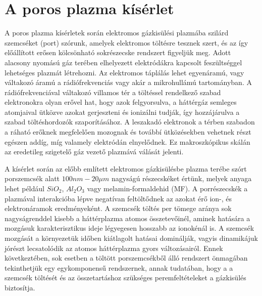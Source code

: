 \chapter{A poros plazma kísérlet}


{\color{red}
	A poros plazma kísérletek során elektromos gázkisülési
        plazmába szilárd szemcséket (port) szórunk, amelyek
        elektromos töltésre tesznek szert, és az így
        előállított erősen kölcsönható sokrészecske rendszert
        figyeljük meg. Adott alacsony nyomású gáz terében elhelyezett
        elektródákra kapcsolt feszültséggel  
	lehetséges plazmát létrehozni. Az elektromos táplálás lehet
        egyenáramú, vagy váltakozó áramú a rádiófrekvenciás vagy akár
        a mikrohullámú tartományban. A rádiófrekvenciával váltakozó
        villamos tér a töltéssel rendelkező szabad elektronokra 
	olyan erővel hat, hogy azok felgyorsulva, a háttérgáz semleges
        atomjaival ütközve azokat gerjeszteni és ionizálni tudják, így
        hozzájárulva a szabad töltéshordozók szaporításához.
	A leszakadó elektronok a térben szabadon a ráható erőknek
        megfelelően mozognak és továbbí ütközésekben vehetnek részt
        egészen addíg, míg valamely elektródán elnyelődnek.
	Ez makroszkópikus skálán az eredetileg szigetelő gáz vezető
        plazmává válását jelenti.  

A kísérlet során az előbb említett elektromos gázkisülésbe plazma terébe szórt porszemcsék alatt
	$100nm - 20\mu m$ nagyságú részecskéket értünk, melyek anyaga
        lehet például $SiO_2$, $Al_2O_3$ vagy 
	melamin-formaldehid (MF). A porrészecskék a plazmával
        interakcióba lépve negatívan feltöltődnek az azokat érő ion-,
        és elektronáramok eredményeként. A szemcsék töltés per tömege
        aránya sok nagyságrenddel kisebb a háttérplazma atomos összetevőinél,
        aminek hatására a mozgásuk karakterisztikus ideje légyegesen
        hosszabb az ionokénál is. A szemcsék
        mozgását a környezetük időben kiátlagolt hatásai dominálják,
        vagyis dinamikájuk jórészt lecsatolódik az atomos háttérplazma
        gyors változásairól. Ennek következtében, sok esetben a
        töltött porszemcsékből álló rendszert önmagában tekinthetjük
        egy egykomponensű rendszernek, annak tudatában, hogy a
        a szemcsék töltését és az összetartáshoz szükséges
        peremfeltételeket a gázkisülés biztosítja.
}	

